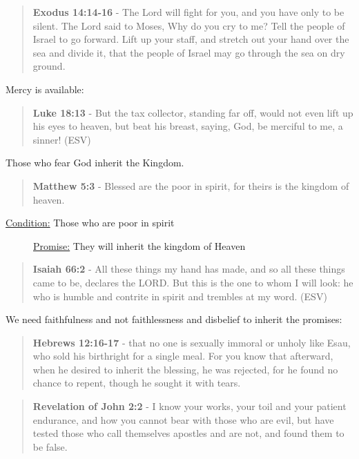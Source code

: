 \documentclass[11pt]{article}
\begin{document}
\begin{quote}
\textbf{Exodus 14:14-16} - The Lord will fight for you, and you have only to be silent.  The Lord said to Moses, Why do you cry to me? Tell the people of Israel to go forward.  Lift up your staff, and stretch out your hand over the sea and divide it, that the people of Israel may go through the sea on dry ground.
\end{quote}

Mercy is available:

\begin{quote}
\textbf{Luke 18:13} - But the tax collector, standing far off, would not even lift up his eyes to heaven, but beat his breast, saying, God, be merciful to me, a sinner! (ESV)
\end{quote}

Those who fear God inherit the Kingdom.

\begin{quote}
\textbf{Matthew 5:3} - Blessed are the poor in spirit, for theirs is the kingdom of heaven.
\end{quote}

\begin{description}
\item[{\uline{Condition:} Those who are poor in spirit}] \uline{Promise:} They will inherit the kingdom of Heaven
\end{description}

\begin{quote}
\textbf{Isaiah 66:2} - All these things my hand has made, and so all these things came to be, declares the LORD. But this is the one to whom I will look: he who is humble and contrite in spirit and trembles at my word. (ESV)
\end{quote}

We need faithfulness and not faithlessness and disbelief to inherit the promises:

\begin{quote}
\textbf{Hebrews 12:16-17} - that no one is sexually immoral or unholy like Esau, who sold his birthright for a single meal. For you know that afterward, when he desired to inherit the blessing, he was rejected, for he found no chance to repent, though he sought it with tears.
\end{quote}

\begin{quote}
\textbf{Revelation of John 2:2} - I know your works, your toil and your patient endurance, and how you cannot bear with those who are evil, but have tested those who call themselves apostles and are not, and found them to be false.
\end{quote}
\end{document}
